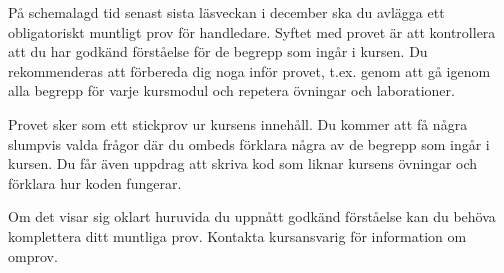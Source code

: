På schemalagd tid senast sista läsveckan i december ska du avlägga ett obligatoriskt muntligt prov för handledare. Syftet med provet är att kontrollera att du har godkänd förståelse för de begrepp som ingår i kursen. Du rekommenderas att förbereda dig noga inför provet, t.ex. genom att gå igenom alla begrepp för varje kursmodul och repetera övningar och laborationer.

Provet sker som ett stickprov ur kursens innehåll. Du kommer att få några slumpvis valda frågor där du ombeds förklara några av de begrepp som ingår i kursen. Du får även uppdrag att skriva kod som liknar kursens övningar och förklara hur koden fungerar. 

Om det visar sig oklart huruvida du uppnått godkänd förståelse kan du behöva komplettera ditt muntliga prov. Kontakta kursansvarig för information om omprov.  
